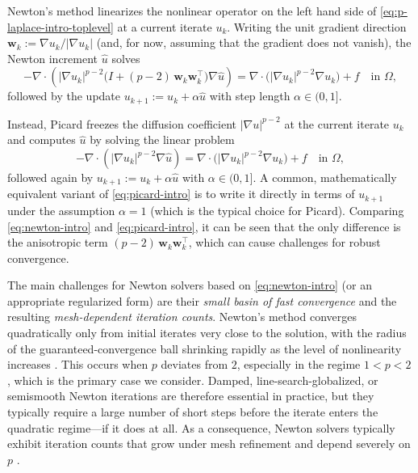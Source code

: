 \documentclass[11pt,pdflatex,sn-mathphys-num]{sn-jnl}
\theoremstyle{thmstyleone}%
\theoremstyle{thmstyletwo}%
\theoremstyle{thmstylethree}%
\newcommand{\bs}[1]{\ensuremath{\boldsymbol{#1}}}
\begin{document}
Newton's method linearizes the nonlinear operator on the left hand side of \eqref{eq:p-laplace-intro-toplevel}
at a current iterate $u_k$. Writing the unit gradient direction $\bs{w}_k := \nabla u_k/|\nabla u_k|$ (and, for now, assuming that the gradient does not vanish), the Newton increment $\hat u$ solves
\begin{equation}
\label{eq:newton-intro}
-\nabla\cdot\left(|\nabla u_k|^{p-2}
\bigl(I + (p-2)\,\bs{w}_k\bs{w}_k^\top\bigr)\nabla\hat u\right)
= \nabla\cdot\bigl(|\nabla u_k|^{p-2}\nabla u_k\bigr) + f
\quad\text{in }\Omega,
\end{equation}
followed by the update $u_{k+1} := u_k + \alpha\hat u$ with step length $\alpha\in(0,1]$.

Instead, Picard freezes the diffusion coefficient $|\nabla u|^{p-2}$ at the current iterate $u_k$ and computes $\hat u$ by solving the linear problem
\begin{equation}
\label{eq:picard-intro}
-\nabla\cdot\left(|\nabla u_k|^{p-2}\nabla \hat u\right) = \nabla\cdot\bigl(|\nabla u_k|^{p-2}\nabla u_k\bigr) + f
\quad\text{in }\Omega,
\end{equation}
followed again by $u_{k+1} := u_k + \alpha\hat u$ with $\alpha\in (0,1]$.
A common, mathematically equivalent variant of \eqref{eq:picard-intro} is to write it directly in terms of $u_{k+1}$ under the assumption $\alpha=1$ (which is the typical choice for Picard).
Comparing \eqref{eq:newton-intro} and \eqref{eq:picard-intro}, it can be seen that the only difference is the anisotropic term $(p-2)\,\bs{w}_k\bs{w}_k^\top$, which can cause challenges for robust convergence.

The main challenges for Newton solvers based on \eqref{eq:newton-intro} (or an appropriate regularized form) are their \emph{small basin of fast convergence} and the resulting \emph{mesh-dependent iteration counts}. Newton's method converges quadratically only from initial iterates very close to the solution, with the radius of the guaranteed-convergence ball shrinking rapidly as the level of nonlinearity increases \cite{Deuflhard04,schmidt-pStokes-global}. This occurs when $p$ deviates from $2$, especially in the regime $1<p< 2$, which is the primary case we consider.
Damped, line-search-globalized, or semismooth Newton iterations are therefore essential in practice, but they typically require a large number of short steps before the iterate enters the quadratic regime---if it does at all. 
As a consequence, Newton solvers typically exhibit iteration
counts that grow under mesh refinement and depend severely on $p$
\cite{HuangLiLiu07, Loisel20, HeinleinKlawonnLanser22}. 
\end{document}
